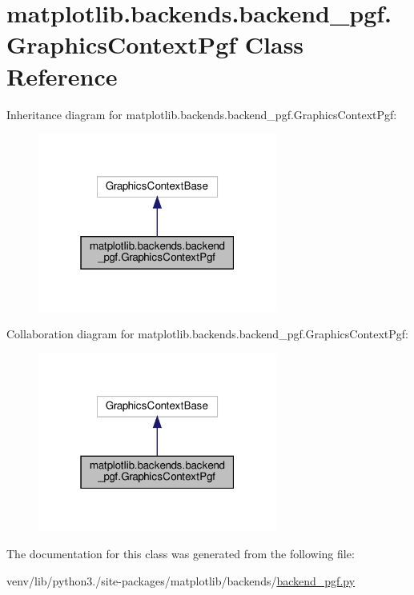 \hypertarget{classmatplotlib_1_1backends_1_1backend__pgf_1_1GraphicsContextPgf}{}\section{matplotlib.\+backends.\+backend\+\_\+pgf.\+Graphics\+Context\+Pgf Class Reference}
\label{classmatplotlib_1_1backends_1_1backend__pgf_1_1GraphicsContextPgf}


Inheritance diagram for matplotlib.\+backends.\+backend\+\_\+pgf.\+Graphics\+Context\+Pgf\+:
\nopagebreak
\begin{figure}[H]
\begin{center}
\leavevmode
\includegraphics[width=223pt]{classmatplotlib_1_1backends_1_1backend__pgf_1_1GraphicsContextPgf__inherit__graph}
\end{center}
\end{figure}


Collaboration diagram for matplotlib.\+backends.\+backend\+\_\+pgf.\+Graphics\+Context\+Pgf\+:
\nopagebreak
\begin{figure}[H]
\begin{center}
\leavevmode
\includegraphics[width=223pt]{classmatplotlib_1_1backends_1_1backend__pgf_1_1GraphicsContextPgf__coll__graph}
\end{center}
\end{figure}


The documentation for this class was generated from the following file\+:\begin{DoxyCompactItemize}
\item 
venv/lib/python3./site-\/packages/matplotlib/backends/\hyperlink{backend__pgf_8py}{backend\+\_\+pgf.\+py}\end{DoxyCompactItemize}
